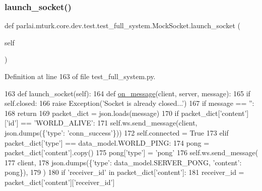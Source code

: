 \subsubsection{\texorpdfstring{launch\+\_\+socket()}{launch\_socket()}}
{\footnotesize\ttfamily def parlai.\+mturk.\+core.\+dev.\+test.\+test\+\_\+full\+\_\+system.\+Mock\+Socket.\+launch\+\_\+socket (\begin{DoxyParamCaption}\item[{}]{self }\end{DoxyParamCaption})}



Definition at line 163 of file test\+\_\+full\+\_\+system.\+py.


\begin{DoxyCode}
163     \textcolor{keyword}{def }launch\_socket(self):
164         \textcolor{keyword}{def }\hyperlink{namespaceparlai_1_1chat__service_1_1services_1_1terminal__chat_1_1client_a0ef2bb2bd3b966dcdd8402a92b999708}{on\_message}(client, server, message):
165             \textcolor{keywordflow}{if} self.closed:
166                 \textcolor{keywordflow}{raise} Exception(\textcolor{stringliteral}{'Socket is already closed...'})
167             \textcolor{keywordflow}{if} message == \textcolor{stringliteral}{''}:
168                 \textcolor{keywordflow}{return}
169             packet\_dict = json.loads(message)
170             \textcolor{keywordflow}{if} packet\_dict[\textcolor{stringliteral}{'content'}][\textcolor{stringliteral}{'id'}] == \textcolor{stringliteral}{'WORLD\_ALIVE'}:
171                 self.ws.send\_message(client, json.dumps(\{\textcolor{stringliteral}{'type'}: \textcolor{stringliteral}{'conn\_success'}\}))
172                 self.connected = \textcolor{keyword}{True}
173             \textcolor{keywordflow}{elif} packet\_dict[\textcolor{stringliteral}{'type'}] == data\_model.WORLD\_PING:
174                 pong = packet\_dict[\textcolor{stringliteral}{'content'}].copy()
175                 pong[\textcolor{stringliteral}{'type'}] = \textcolor{stringliteral}{'pong'}
176                 self.ws.send\_message(
177                     client,
178                     json.dumps(\{\textcolor{stringliteral}{'type'}: data\_model.SERVER\_PONG, \textcolor{stringliteral}{'content'}: pong\}),
179                 )
180             \textcolor{keywordflow}{if} \textcolor{stringliteral}{'receiver\_id'} \textcolor{keywordflow}{in} packet\_dict[\textcolor{stringliteral}{'content'}]:
181                 receiver\_id = packet\_dict[\textcolor{stringliteral}{'content'}][\textcolor{stringliteral}{'receiver\_id'}]

\end{DoxyCode}
